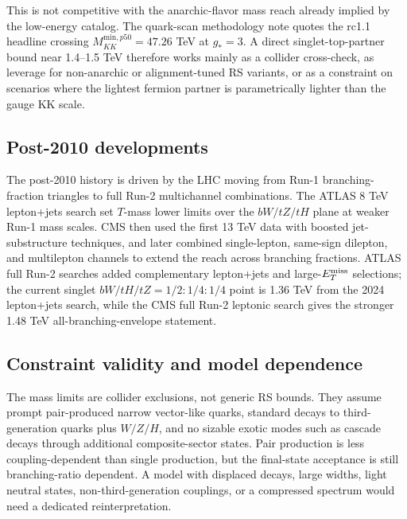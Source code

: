 This is not competitive with the anarchic-flavor mass reach already implied by
the low-energy catalog.  The quark-scan methodology note quotes the rc1.1
headline crossing \(M_{KK}^{\mathrm{min},p50}=47.26\) TeV at \(g_*=3\).  A direct
singlet-top-partner bound near 1.4--1.5 TeV therefore works mainly as a
collider cross-check, as leverage for non-anarchic or alignment-tuned RS
variants, or as a constraint on scenarios where the lightest fermion partner
is parametrically lighter than the gauge KK scale.

\subsection*{Post-2010 developments}
The post-2010 history is driven by the LHC moving from Run-1 branching-fraction
triangles to full Run-2 multichannel combinations.  The ATLAS 8 TeV
lepton+jets search set \(T\)-mass lower limits over the \(bW/tZ/tH\) plane at
weaker Run-1 mass scales.  CMS then used the first 13 TeV data with boosted
jet-substructure techniques, and later combined single-lepton, same-sign
dilepton, and multilepton channels to extend the reach across branching
fractions.  ATLAS full Run-2 searches added complementary lepton+jets and
large-\(E_T^{\rm miss}\) selections; the current singlet
\(bW/tH/tZ=1/2:1/4:1/4\) point is 1.36 TeV from the 2024 lepton+jets search,
while the CMS full Run-2 leptonic search gives the stronger 1.48 TeV
all-branching-envelope statement.

\subsection*{Constraint validity and model dependence}
The mass limits are collider exclusions, not generic RS bounds.  They assume
prompt pair-produced narrow vector-like quarks, standard decays to
third-generation quarks plus \(W/Z/H\), and no sizable exotic modes such as
cascade decays through additional composite-sector states.  Pair production is
less coupling-dependent than single production, but the final-state acceptance
is still branching-ratio dependent.  A model with displaced decays, large
widths, light neutral states, non-third-generation couplings, or a compressed
spectrum would need a dedicated reinterpretation.

